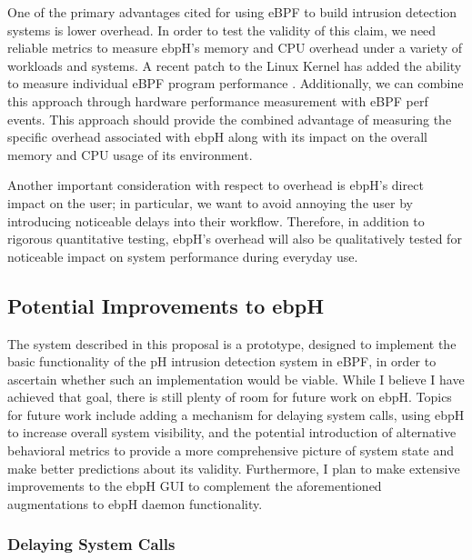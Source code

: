 \documentclass[
  12pt]{findlay}
\begin{document}
One of the primary advantages cited for using eBPF to build intrusion
detection systems is lower overhead. In order to test the validity of
this claim, we need reliable metrics to measure ebpH's memory and CPU
overhead under a variety of workloads and systems. A recent patch to the
Linux Kernel has added the ability to measure individual eBPF program
performance \autocite{starovoitov19a}. Additionally, we can combine this
approach through hardware performance measurement with eBPF perf events.
This approach should provide the combined advantage of measuring the
specific overhead associated with ebpH along with its impact on the
overall memory and CPU usage of its environment.

Another important consideration with respect to overhead is ebpH's
direct impact on the user; in particular, we want to avoid annoying the
user by introducing noticeable delays into their workflow. Therefore, in
addition to rigorous quantitative testing, ebpH's overhead will also be
qualitatively tested for noticeable impact on system performance during
everyday use.

\hypertarget{potential-improvements-to-ebph}{%
\subsection{Potential Improvements to
ebpH}\label{potential-improvements-to-ebph}}

The system described in this proposal is a prototype, designed to
implement the basic functionality of the pH intrusion detection system
in eBPF, in order to ascertain whether such an implementation would be
viable. While I believe I have achieved that goal, there is still plenty
of room for future work on ebpH. Topics for future work include adding a
mechanism for delaying system calls, using ebpH to increase overall
system visibility, and the potential introduction of alternative
behavioral metrics to provide a more comprehensive picture of system
state and make better predictions about its validity. Furthermore, I
plan to make extensive improvements to the ebpH GUI to complement the
aforementioned augmentations to ebpH daemon functionality.

\hypertarget{delaying-system-calls}{%
\subsubsection{Delaying System Calls}\label{delaying-system-calls}}
\end{document}
